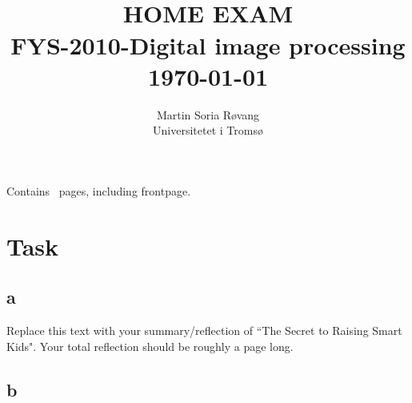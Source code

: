 
\usepackage{amssymb}
\usepackage{gensymb}
\usepackage{amsmath}


{\selectfont
\title{ \normalsize \textsc{}
		\\ [1.0cm] %
        \LARGE \textbf{\uppercase{Home Exam}
        \HRule{0.5pt} \\ [0.5cm]
        FYS-2010-Digital image processing
        \\
		\normalsize \today \vspace*{5\baselineskip}}
		}

        \date{}
\author{
		Martin Soria Røvang \\ 
        Universitetet i Tromsø \\}

\clearpage\maketitle
\vspace{0.2\textheight}
{\centering
Contains \pageref{LastPage} \, pages, including frontpage.\par
}
\thispagestyle{empty}

\newpage
\tableofcontents


\newpage

\section{Task}
\subsection{a}

Replace this text with your summary/reflection of ``The Secret to Raising Smart Kids".  Your total reflection should be roughly a page long.
 
\cite{alpaydin_2014}


\subsection{b}












}
